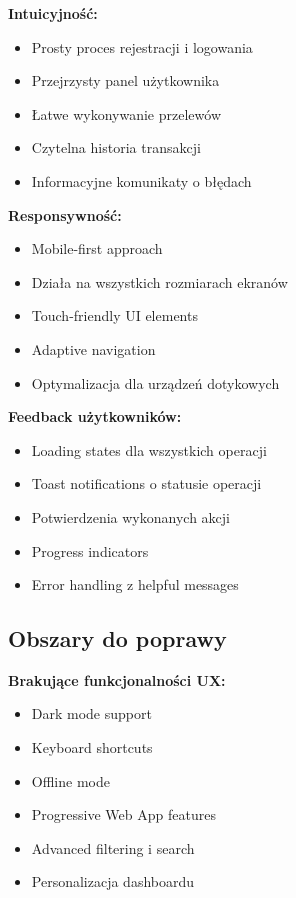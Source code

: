 \documentclass[12pt,a4paper]{article}
\begin{document}
    \textbf{Intuicyjność:}
    \begin{itemize}
        \item Prosty proces rejestracji i logowania
        \item Przejrzysty panel użytkownika
        \item Łatwe wykonywanie przelewów
        \item Czytelna historia transakcji
        \item Informacyjne komunikaty o błędach
    \end{itemize}

    \textbf{Responsywność:}
    \begin{itemize}
        \item Mobile-first approach
        \item Działa na wszystkich rozmiarach ekranów
        \item Touch-friendly UI elements
        \item Adaptive navigation
        \item Optymalizacja dla urządzeń dotykowych
    \end{itemize}

    \textbf{Feedback użytkowników:}
    \begin{itemize}
        \item Loading states dla wszystkich operacji
        \item Toast notifications o statusie operacji
        \item Potwierdzenia wykonanych akcji
        \item Progress indicators
        \item Error handling z helpful messages
    \end{itemize}

    \subsection{Obszary do poprawy}

    \textbf{Brakujące funkcjonalności UX:}
    \begin{itemize}
        \item Dark mode support
        \item Keyboard shortcuts
        \item Offline mode
        \item Progressive Web App features
        \item Advanced filtering i search
        \item Personalizacja dashboardu
    \end{itemize}
\end{document}
